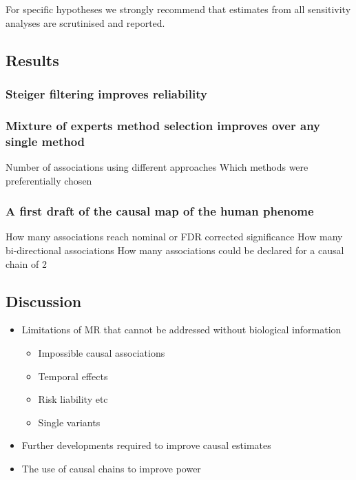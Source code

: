 \documentclass[]{article}
\providecommand{\tightlist}{%
  \setlength{\itemsep}{0pt}\setlength{\parskip}{0pt}}
\begin{document}
For specific hypotheses we strongly recommend that estimates from all
sensitivity analyses are scrutinised and reported.

\subsection{Results}\label{results}

\subsubsection{Steiger filtering improves
reliability}\label{steiger-filtering-improves-reliability}

\subsubsection{Mixture of experts method selection improves over any
single
method}\label{mixture-of-experts-method-selection-improves-over-any-single-method}

Number of associations using different approaches Which methods were
preferentially chosen

\subsubsection{A first draft of the causal map of the human
phenome}\label{a-first-draft-of-the-causal-map-of-the-human-phenome}

How many associations reach nominal or FDR corrected significance How
many bi-directional associations How many associations could be declared
for a causal chain of 2

\subsection{Discussion}\label{discussion}

\begin{itemize}
\tightlist
\item
  Limitations of MR that cannot be addressed without biological
  information

  \begin{itemize}
  \tightlist
  \item
    Impossible causal associations
  \item
    Temporal effects
  \item
    Risk liability etc
  \item
    Single variants
  \end{itemize}
\item
  Further developments required to improve causal estimates
\item
  The use of causal chains to improve power
\end{itemize}
\end{document}

